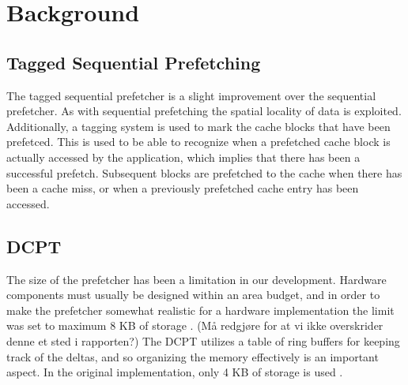 \section{Background}

\subsection*{Tagged Sequential Prefetching}

The tagged sequential prefetcher is a slight improvement over the sequential
prefetcher. As with sequential prefetching the spatial locality 
of data is exploited. Additionally, a tagging system is used to mark the cache 
blocks that have been prefetced. This is used to be able to recognize when a 
prefetched cache block is actually accessed by the application, which implies 
that there has been a successful prefetch. Subsequent blocks are prefetched 
to the cache when there has been a cache miss, or when a previously prefetched 
cache entry has been accessed.\cite{grannaes}

\subsection*{DCPT}

The size of the prefetcher has been a limitation in our development. Hardware
components must usually be designed within an area budget, and in order to make
the prefetcher somewhat realistic for a hardware implementation the limit was
set to maximum 8 KB of storage \cite{guidelines}. (Må redgjøre for at vi ikke overskrider denne et
sted i rapporten?) The DCPT utilizes a table of ring buffers for keeping track
of the deltas, and so organizing the memory effectively is an important aspect.
In the original implementation, only 4 KB of storage is used \cite{dcpt}.




